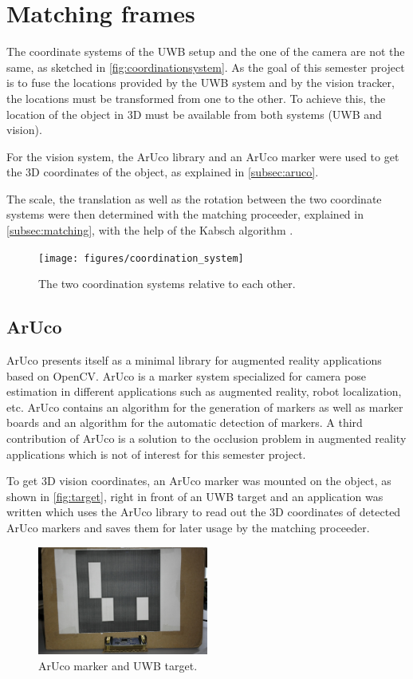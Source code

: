 \section{Matching frames}
The coordinate systems of the UWB setup and the one of the camera are not the same, as sketched in \autoref{fig:coordinationsystem}. As the goal of this semester project is to fuse the locations provided by the UWB system and by the vision tracker, the locations must be transformed from one to the other. To achieve this, the location of the object in 3D must be available from both systems (UWB and vision).

For the vision system, the ArUco \cite{Aruco2014} library and an ArUco marker were used to get the 3D coordinates of the object, as explained in \autoref{subsec:aruco}.

The scale, the translation as well as the rotation between the two coordinate systems were then determined with the matching proceeder, explained in \autoref{subsec:matching}, with the help of the Kabsch algorithm \cite{Kabsch:a12999}.
\begin{figure}[ht!]\centering
	\texttt{[image: figures/coordination\_system]}
	\caption{The two coordination systems relative to each other.}\label{fig:coordinationsystem}
\end{figure}

\subsection{ArUco}\label{subsec:aruco}
ArUco \cite{Aruco2014} presents itself as a minimal library for augmented reality applications based on OpenCV. ArUco is a marker system specialized for camera pose estimation in different applications such as augmented reality, robot localization, etc. ArUco contains an algorithm for the generation of markers as well as marker boards and an algorithm for the automatic detection of markers. A third contribution of ArUco is a solution to the occlusion problem in augmented reality applications which is not of interest for this semester project.

To get 3D vision coordinates, an ArUco marker was mounted on the object, as shown in \autoref{fig:target}, right in front of an UWB target and an application was written which uses the ArUco library to read out the 3D coordinates of detected ArUco markers and saves them for later usage by the matching proceeder.
\begin{figure}[ht!]\centering
	\includegraphics[width=0.5\textwidth]{figures/Box_cut.jpg}
	\caption{ArUco marker and UWB target.}\label{fig:target}
\end{figure}

